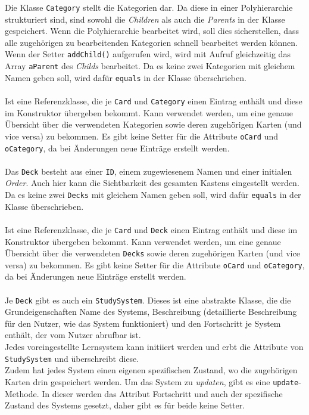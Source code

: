 \documentclass[fontsize=12pt,paper=a4,twoside]{scrartcl}
\begin{document}
\newpage
{}
Die Klasse \texttt{Category} stellt die Kategorien dar. Da diese in einer Polyhierarchie strukturiert sind, sind sowohl die \textit{Children} als auch die \textit{Parents} in der Klasse gespeichert. Wenn die Polyhierarchie bearbeitet wird, soll dies sicherstellen, dass alle zugehörigen zu bearbeitenden Kategorien schnell bearbeitet werden können. Wenn der Setter \texttt{addChild()} aufgerufen wird, wird mit Aufruf gleichzeitig das Array \texttt{aParent} des \textit{Childs} bearbeitet. Da es keine zwei Kategorien mit gleichem Namen geben soll, wird dafür \texttt{equals} in der Klasse überschrieben.\\
\\

Ist eine Referenzklasse, die je \texttt{Card} und \texttt{Category} einen Eintrag enthält und diese im Konstruktor übergeben bekommt. Kann verwendet werden, um eine genaue Übersicht über die verwendeten Kategorien sowie deren zugehörigen Karten (und vice versa) zu bekommen. Es gibt keine Setter für die Attribute \texttt{oCard} und \texttt{oCategory}, da bei Änderungen neue Einträge erstellt werden.\\
\\

Das \texttt{Deck} besteht aus einer \texttt{ID}, einem zugewiesenem Namen und einer initialen \textit{Order}. Auch hier kann die Sichtbarkeit des gesamten Kastens eingestellt werden. Da es keine zwei \texttt{Decks} mit gleichem Namen geben soll, wird dafür \texttt{equals} in der Klasse überschrieben. \\
\\

Ist eine Referenzklasse, die je \texttt{Card} und \texttt{Deck} einen Eintrag enthält und diese im Konstruktor übergeben bekommt. Kann verwendet werden, um eine genaue Übersicht über die verwendeten \texttt{Decks} sowie deren zugehörigen Karten (und vice versa) zu bekommen. Es gibt keine Setter für die Attribute \texttt{oCard} und \texttt{oCategory}, da bei Änderungen neue Einträge erstellt werden.\\
\\

\newpage
{}
Je \texttt{Deck} gibt es auch ein \texttt{StudySystem}. Dieses ist eine abstrakte Klasse, die die Grundeigenschaften Name des Systems, Beschreibung (detaillierte Beschreibung für den Nutzer, wie das System funktioniert) und den Fortschritt je System enthält, der vom Nutzer abrufbar ist. \\
Jedes voreingestellte Lernsystem kann initiiert werden und erbt die Attribute von \texttt{StudySystem} und überschreibt diese. \\
Zudem hat jedes System einen eigenen spezifischen Zustand, wo die zugehörigen Karten drin gespeichert werden. Um das System zu \textit{updaten}, gibt es eine \texttt{update}-Methode. In dieser werden das Attribut Fortschritt und auch der spezifische Zustand des Systems gesetzt, daher gibt es für beide keine Setter.\\
\\
\end{document}
